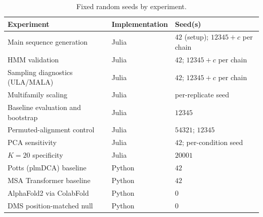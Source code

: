 \begin{table}[ht]
\centering
\caption{Fixed random seeds by experiment.}
\label{tab:seeds}
\small
\begin{tabular}{@{}lll@{}}
\toprule
Experiment & Implementation & Seed(s) \\
\midrule
Main sequence generation             & Julia  & $42$ (setup); $12345{+}c$ per chain \\
HMM validation                       & Julia  & $42$; $12345{+}c$ per chain \\
Sampling diagnostics (ULA/MALA)      & Julia  & $42$; $12345{+}c$ per chain \\
Multifamily scaling                  & Julia  & per-replicate seed \\
Baseline evaluation and bootstrap    & Julia  & $12345$ \\
Permuted-alignment control           & Julia  & $54321$; $12345$ \\
PCA sensitivity                      & Julia  & $42$; per-condition seed \\
$K{=}20$ specificity                 & Julia  & $20001$ \\
Potts (plmDCA) baseline              & Python & $42$ \\
MSA Transformer baseline             & Python & $42$ \\
AlphaFold2 via ColabFold             & Python & $0$ \\
DMS position-matched null            & Python & $0$ \\
\bottomrule
\end{tabular}
\end{table}

